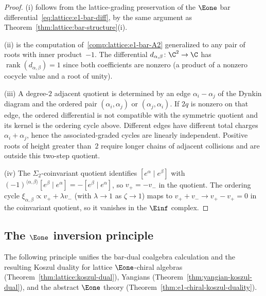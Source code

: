 \begin{proof}
(i) follows from the lattice-grading preservation of the $\Eone$ bar
differential~\eqref{eq:lattice:e1-bar-diff}, by the same argument as
Theorem~\ref{thm:lattice:bar-structure}(i).

(ii) is the computation of~\ref{comp:lattice:e1-bar-A2} generalized
to any pair of roots with inner product~$-1$. The differential
$d_{\alpha,\beta} \colon \C^2 \to \C$ has
$\operatorname{rank}(d_{\alpha,\beta}) = 1$ since both coefficients are nonzero
(a product of a nonzero cocycle value and a root of unity).

(iii) A degree-$2$ adjacent quotient is determined by an edge
$\alpha_i-\alpha_j$ of the Dynkin diagram and the ordered pair
$(\alpha_i,\alpha_j)$ or $(\alpha_j,\alpha_i)$. If $2q$ is nonzero on
that edge, the ordered differential is not compatible with the
symmetric quotient and its kernel is the ordering cycle above.
Different edges have different total charges
$\alpha_i+\alpha_j$, hence the associated-graded cycles are linearly
independent. Positive roots of height greater than~$2$ require longer
chains of adjacent collisions and are outside this two-step quotient.

(iv) The $\Sigma_2$-coinvariant quotient identifies
$[e^\alpha \mid e^\beta]$ with
$(-1)^{\langle\alpha,\beta\rangle} [e^\beta \mid e^\alpha]
= -[e^\beta \mid e^\alpha]$, so $v_+ = -v_-$ in the quotient.
The ordering cycle
$\xi_{\alpha,\beta} \propto v_+ + \lambda v_-$ (with $\lambda \to 1$
as $\zeta \to 1$) maps to $v_+ + v_- \to v_+ - v_+ = 0$ in the
coinvariant quotient, so it vanishes in the $\Einf$ complex.
\end{proof}


\subsection{The $\Eone$ inversion principle}

The following principle unifies the bar-dual coalgebra calculation
and the resulting Koszul duality for
lattice $\Eone$-chiral algebras
(Theorem~\ref{thm:lattice:koszul-dual}),
Yangians (Theorem~\ref{thm:yangian-koszul-dual}), and the
abstract $\Eone$ theory
(Theorem~\ref{thm:e1-chiral-koszul-duality}).

